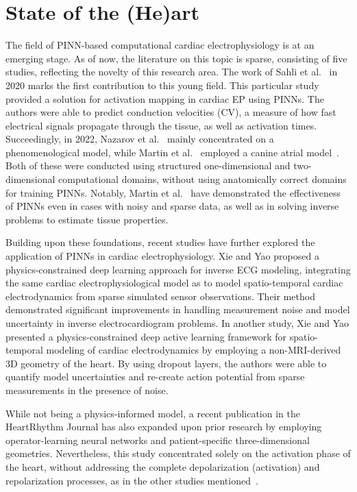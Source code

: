 \section{State of the (He)art}
The field of PINN-based computational cardiac electrophysiology  is at an emerging stage. As of now, the literature on this topic is sparse, consisting of five studies, reflecting the novelty of this research area. The work of Sahli et al.~\cite{SAHLI} in 2020 marks the first contribution to this young field. This particular study provided a solution for activation mapping in cardiac EP using PINNs. The authors were able to predict conduction velocities (CV), a measure of how fast electrical signals propagate through the tissue, as well as activation times. Succeedingly, in 2022, Nazarov et al.~\cite{Nazarov} mainly concentrated on a phenomenological model, while Martin et al.~\cite{EP-PINNs} employed a canine atrial model~\cite{ALIEV1996293}. Both of these were conducted using structured one-dimensional and two-dimensional computational domains, without using anatomically correct domains for training PINNs. Notably, Martin et al.~\cite{EP-PINNs} have demonstrated the effectiveness of PINNs even in cases with noisy and sparse data, as well as in solving inverse problems to estimate tissue properties.

Building upon these foundations, recent studies have further explored the application of PINNs in cardiac electrophysiology. Xie and Yao \cite{PDL} proposed a physics-constrained deep learning approach for inverse ECG modeling, integrating the same cardiac electrophysiological model as \cite{EP-PINNs} to model spatio-temporal cardiac electrodynamics from sparse simulated sensor observations. Their method demonstrated significant improvements in handling measurement noise and model uncertainty in inverse electrocardiogram problems. In another study, Xie and Yao \cite{inverse_ECG} presented a physics-constrained deep active learning framework for spatio-temporal modeling of cardiac electrodynamics by employing a non-MRI-derived 3D geometry of the heart. By using dropout layers, the authors were able to quantify model uncertainties and re-create action potential from sparse measurements in the presence of noise.

While not being a physics-informed model, a recent publication in the HeartRhythm Journal has also expanded upon prior research by employing operator-learning neural networks and patient-specific three-dimensional geometries. Nevertheless, this study concentrated solely on the activation phase of the heart, without addressing the complete depolarization (activation) and repolarization processes, as in the other studies mentioned~\cite{YinMinglang2023PAND}.

